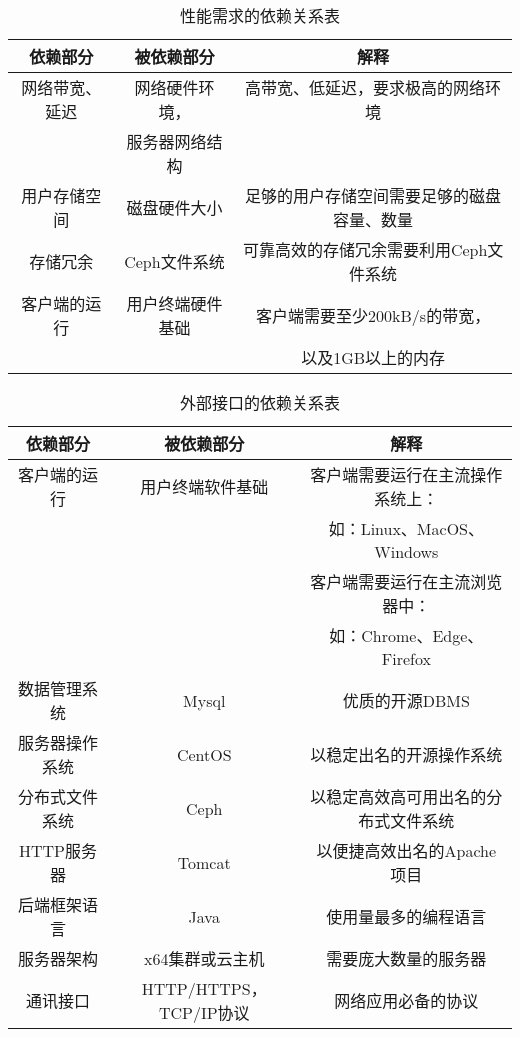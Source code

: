 \begin{table}[htbp]
\centering
\caption{性能需求的依赖关系表} \label{tab:simpletable}
\begin{tabular}{|c|c|c|}
    \hline
    依赖部分 & 被依赖部分 & 解释  \\
    \hline
    网络带宽、延迟 & 网络硬件环境， & 高带宽、低延迟，要求极高的网络环境 \\
    & 服务器网络结构 &  \\
    \hline
    用户存储空间 & 磁盘硬件大小 & 足够的用户存储空间需要足够的磁盘容量、数量 \\
    \hline
    存储冗余 & Ceph文件系统 & 可靠高效的存储冗余需要利用Ceph文件系统 \\
    \hline
    客户端的运行 & 用户终端硬件基础 & 客户端需要至少200kB/s的带宽，\\ & & 以及1GB以上的内存 \\
    \hline
    
\end{tabular}
\end{table} 




\begin{table}[htbp]
\centering
\caption{外部接口的依赖关系表} \label{tab:simpletable}
\begin{tabular}{|c|c|c|}
    \hline
    依赖部分 & 被依赖部分 & 解释  \\
    \hline
    客户端的运行 & 用户终端软件基础 & 客户端需要运行在主流操作系统上：\\ & & 如：Linux、MacOS、Windows \\ & & 客户端需要运行在主流浏览器中： \\ & & 如：Chrome、Edge、Firefox \\
    \hline
    数据管理系统 & Mysql & 优质的开源DBMS \\
    \hline
    服务器操作系统 & CentOS & 以稳定出名的开源操作系统\\
    \hline
    分布式文件系统 & Ceph & 以稳定高效高可用出名的分布式文件系统\\
    \hline
    HTTP服务器 & Tomcat & 以便捷高效出名的Apache项目 \\
    \hline
    后端框架语言 & Java & 使用量最多的编程语言\\
    \hline
    服务器架构 & x64集群或云主机 & 需要庞大数量的服务器\\
    \hline
    通讯接口 & HTTP/HTTPS，TCP/IP协议 & 网络应用必备的协议 \\
    \hline
    
\end{tabular}
\end{table} 



    